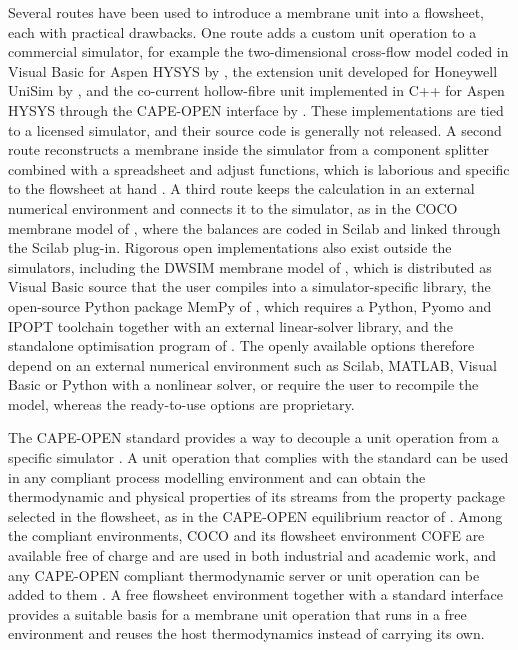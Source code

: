 \documentclass[a4paper,fleqn]{cas-dc}
\begin{document}
Several routes have been used to introduce a membrane unit into a flowsheet, each
with practical drawbacks. One route adds a custom unit operation to a commercial
simulator, for example the two-dimensional cross-flow model coded in Visual Basic
for Aspen HYSYS by \citet{ahmad2012}, the extension unit developed for Honeywell
UniSim by \citet{bocciardo2013}, and the co-current hollow-fibre unit implemented
in C++ for Aspen HYSYS through the CAPE-OPEN interface by \citet{salano2025}.
These implementations are tied to a licensed simulator, and their source code is
generally not released. A second route reconstructs a membrane inside the
simulator from a component splitter combined with a spreadsheet and adjust
functions, which is laborious and specific to the flowsheet at hand
\citep{alqaheem2024accuracy,alqaheem2021}. A third route keeps the calculation in an external
numerical environment and connects it to the simulator, as in the COCO membrane
model of \citet{alqaheem2024coco}, where the balances are coded in Scilab and
linked through the Scilab plug-in. Rigorous open implementations also exist
outside the simulators, including the DWSIM membrane model of \citet{aziaba2022},
which is distributed as Visual Basic source that the user compiles into a
simulator-specific library, the open-source Python package MemPy of
\citet{dejaco2020}, which requires a Python, Pyomo and IPOPT toolchain together
with an external linear-solver library, and the standalone optimisation program
of \citet{bozorg2019}. The openly available options therefore depend on an
external numerical environment such as Scilab, MATLAB, Visual Basic or Python
with a nonlinear solver, or require the user to recompile the model, whereas the
ready-to-use options are proprietary.

The CAPE-OPEN standard provides a way to decouple a unit operation from a
specific simulator \citep{cocolan_uo,vanbatenpons2014}. A unit operation that
complies with the standard can be used in any compliant process modelling
environment and can obtain the thermodynamic and physical properties of its
streams from the property package selected in the flowsheet, as in the
CAPE-OPEN equilibrium reactor of \citet{vanbatenszczepanski2011}. Among the compliant environments,
COCO and its flowsheet environment COFE are available free of charge and are
used in both industrial and academic work, and any CAPE-OPEN compliant
thermodynamic server or unit operation can be added to them
\citep{andreasenvanbaten2025}. A free flowsheet environment together with a
standard interface provides a suitable basis for a membrane unit operation that
runs in a free environment and reuses the host thermodynamics instead of
carrying its own.
\end{document}
